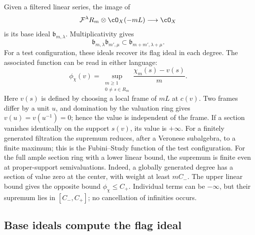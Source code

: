 Given a filtered linear series, the image of
\[
 \mathcal F^\lambda R_m\otimes\cO_X(-mL)\longrightarrow\cO_X
\]
is its base ideal $\mathfrak b_{m,\lambda}$.  Multiplicativity gives
\begin{equation}
\label{eq:filtered-base-ideals}
 \mathfrak b_{m,\lambda}\mathfrak b_{m',\mu}
       \subset\mathfrak b_{m+m',\lambda+\mu}.
\end{equation}
For a test configuration, these ideals recover its flag ideal in each
degree.  The associated function can be read in either language:
\begin{equation}
\label{eq:norm-fs-function}
 \phi_\chi(v)
   =\sup_{\substack{m\geq1\\0\ne s\in R_m}}
        \frac{\chi_m(s)-v(s)}{m}.
\end{equation}
Here $v(s)$ is defined by choosing a local frame of $mL$ at $c(v)$.
Two frames differ by a unit $u$, and domination by the valuation ring gives
$v(u)=v(u^{-1})=0$; hence the value is independent of the frame.  If a
section vanishes identically on the support $s(v)$, its value is
$+\infty$.
For a finitely generated filtration the supremum reduces, after a Veronese
subalgebra, to a finite maximum; this is the Fubini--Study function of the
test configuration.  For the full ample section ring with a lower linear bound, the supremum is finite even at proper-support semivaluations. Indeed, a globally generated degree has a section of value zero at the center, with weight at least $mC_-$. The upper linear bound gives the opposite bound $\phi_\chi\leq C_+$. Individual terms can be $-\infty$, but their supremum lies in $[C_-,C_+]$; no cancellation of infinities occurs.

\subsection{Base ideals compute the flag ideal}
\label{sec:ch33-base-ideal-flag}

